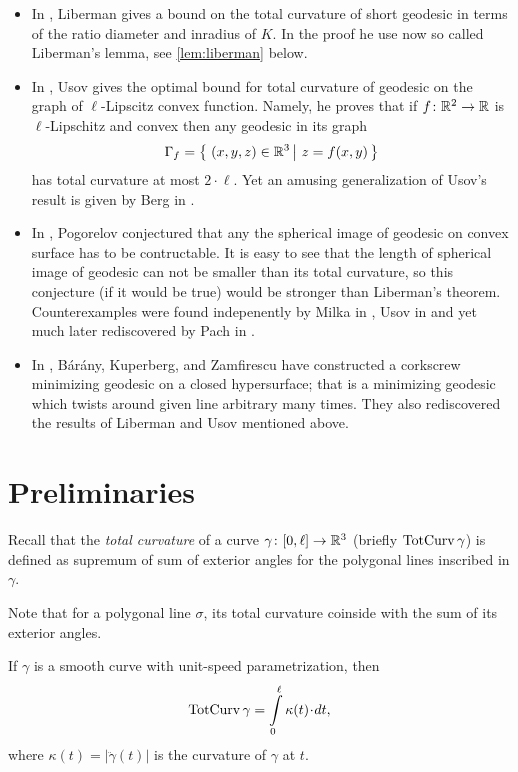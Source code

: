 \documentclass[a4paper,10pt]{amsart}
\begin{document}
\begin{itemize}
\item In \cite{liberman}, Liberman gives a bound on the total curvature of short geodesic in terms of the ratio diameter and inradius of $K$.
In the proof he use now so called Liberman's lemma,
see \ref{lem:liberman} below.

\item In \cite{usov}, 
Usov gives the optimal bound for total curvature of geodesic on the graph of $\ell$-Lipscitz convex function. 
Namely, he proves that if $f\colon\mathbb{R}^2\to\mathbb{R}$ is $\ell$-Lipschitz and convex then any 
geodesic in its graph 
\[\Gamma_f=\set{(x,y,z)\in \RR^3}{z=f(x,y)}\] 
has total curvature at most $2\cdot \ell$.
Yet an amusing generalization of Usov's result is given by Berg in \cite{berg}.
\item In \cite{pogorelov}, Pogorelov conjectured that any the spherical image of geodesic on convex surface has to be contructable.
It is easy to see that the length of spherical image of geodesic can not be smaller than its total curvature, 
so this conjecture (if it would be true) 
would be stronger than Liberman's theorem.
Counterexamples were found indepenently by Milka in \cite{milka}, 
Usov in \cite{usov-conj-pog} 
and yet much later rediscovered by Pach in \cite{pach}.
\item In \cite{BKZ},
B{\'a}r{\'a}ny,
Kuperberg, 
and Zamfirescu 
have constructed a corkscrew minimizing geodesic on a closed hypersurface;
that is a minimizing geodesic which twists around given line arbitrary many times.
They also rediscovered the results of Liberman and Usov mentioned above.
\end{itemize}


\section{Preliminaries}

Recall that the \emph{total curvature} of a curve $\gamma\colon[0,\ell]\to \mathbb{R}^3$ 
(briefly $\mathop{\rm TotCurv}\nolimits\gamma$)
is defined as supremum of sum of exterior angles 
for the polygonal lines inscribed in $\gamma$.

Note that for a polygonal line $\sigma$, 
its total curvature coinside with the sum of its exterior angles.

If $\gamma$ is a smooth curve with unit-speed parametrization, 
then 
\[\tc\gamma=\int\limits_0^\ell \kappa(t)\cdot dt,\]
where $\kappa(t)=|\ddot\gamma(t)|$ is the curvature of $\gamma$ at $t$.
\end{document}
